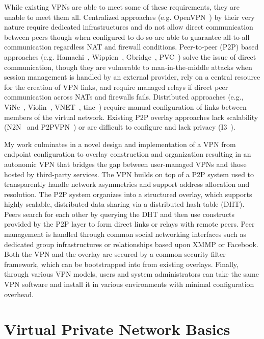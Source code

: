 While existing VPNs are able to meet some of these requirements, they are
unable to meet them all.  Centralized approaches (e.g.  OpenVPN~\cite{openvpn})
by their very nature require dedicated infrastructures and do not allow direct
communication between peers though when configured to do so are able to
guarantee all-to-all communication regardless NAT and firewall conditions.
Peer-to-peer (P2P) based approaches (e.g.  Hamachi~\cite{hamachi},
Wippien~\cite{wippien}, Gbridge~\cite{gbridge}, PVC~\cite{pvc}) solve the issue
of direct communication, though they are vulnerable to man-in-the-middle
attacks when session management is handled by an external provider, rely on a
central resource for the creation of VPN links, and require managed relays if
direct peer communication across NATs and firewalls fails.  Distributed
approaches (e.g., ViNe~\cite{vine}, Violin~\cite{violin}, VNET~\cite{vnet},
tinc~\cite{tinc}) require manual configuration of links between members of the
virtual network.  Existing P2P overlay approaches lack scalability
(N2N~\cite{n2n} and P2PVPN~\cite{p2pvpn}) or are difficult to configure and
lack privacy (I3~\cite{i3}).

My work culminates in a novel design and implementation of a VPN from endpoint
configuration to overlay construction and organization resulting in an
autonomic VPN that bridges the gap between user-managed VPNs and those hosted
by third-party services.  The VPN builds on top of a P2P system used to
transparently handle network asymmetries and support address allocation and
resolution.  The P2P system organizes into a structured overlay, which supports
highly scalable, distributed data sharing via a distributed hash table (DHT).
Peers search for each other by querying the DHT and then use constructs
provided by the P2P layer to form direct links or relays with remote peers.
Peer management is handled through common social networking interfaces such as
dedicated group infrastructures or relationships based upon XMMP or Facebook.
Both the VPN and the overlay are secured by a common security filter framework,
which can be bootstrapped into from existing overlays.  Finally, through
various VPN models, users and system administrators can take the same VPN
software and install it in various environments with minimal configuration
overhead.

\section{Virtual Private Network Basics}

